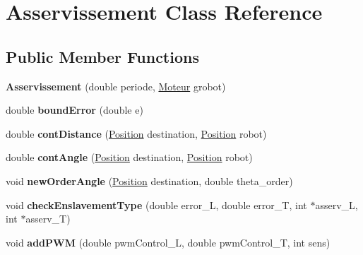 \hypertarget{class_asservissement}{}\section{Asservissement Class Reference}
\label{class_asservissement}
\subsection*{Public Member Functions}
\begin{DoxyCompactItemize}
\item 
{\bfseries Asservissement} (double periode, \hyperlink{class_moteur}{Moteur} grobot)\hypertarget{class_asservissement_a602ab222a93b691ada69cfe11208faf2}{}\label{class_asservissement_a602ab222a93b691ada69cfe11208faf2}

\item 
double {\bfseries bound\+Error} (double e)\hypertarget{class_asservissement_af459078c269e8872c8f9585774b5aee1}{}\label{class_asservissement_af459078c269e8872c8f9585774b5aee1}

\item 
double {\bfseries cont\+Distance} (\hyperlink{struct_position}{Position} destination, \hyperlink{struct_position}{Position} robot)\hypertarget{class_asservissement_a46c56c095e7a01174809cf2683782113}{}\label{class_asservissement_a46c56c095e7a01174809cf2683782113}

\item 
double {\bfseries cont\+Angle} (\hyperlink{struct_position}{Position} destination, \hyperlink{struct_position}{Position} robot)\hypertarget{class_asservissement_a94e0a6d4d378d41daa14bce3f07ea422}{}\label{class_asservissement_a94e0a6d4d378d41daa14bce3f07ea422}

\item 
void {\bfseries new\+Order\+Angle} (\hyperlink{struct_position}{Position} destination, double theta\+\_\+order)\hypertarget{class_asservissement_ab025d475e1daec59e2656fa505ce726d}{}\label{class_asservissement_ab025d475e1daec59e2656fa505ce726d}

\item 
void {\bfseries check\+Enslavement\+Type} (double error\+\_\+L, double error\+\_\+T, int $\ast$asserv\+\_\+L, int $\ast$asserv\+\_\+T)\hypertarget{class_asservissement_a2accd4d87bcaded977d64923388f1a5a}{}\label{class_asservissement_a2accd4d87bcaded977d64923388f1a5a}

\item 
void {\bfseries add\+P\+WM} (double pwm\+Control\+\_\+L, double pwm\+Control\+\_\+T, int sens)\hypertarget{class_asservissement_ad922a1864e6075436f211bd94e019dee}{}\label{class_asservissement_ad922a1864e6075436f211bd94e019dee}


\end{DoxyCompactItemize}
